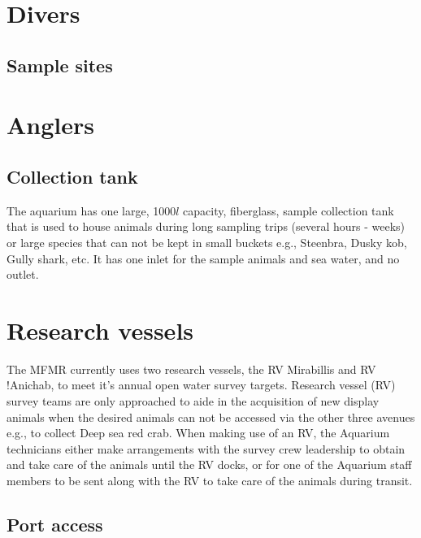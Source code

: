 \documentclass[
  letterpaper,
  DIV=11,
  numbers=noendperiod]{scrreprt}
\begin{document}
\hypertarget{divers}{%
\section{Divers}\label{divers}}

\hypertarget{sample-sites-1}{%
\subsection{Sample sites}\label{sample-sites-1}}

\hypertarget{anglers}{%
\section{Anglers}\label{anglers}}

\hypertarget{collection-tank}{%
\subsection{Collection tank}\label{collection-tank}}

The aquarium has one large, 1000\(l\) capacity, fiberglass, sample
collection tank that is used to house animals during long sampling trips
(several hours - weeks) or large species that can not be kept in small
buckets e.g., Steenbra, Dusky kob, Gully shark, etc. It has one inlet
for the sample animals and sea water, and no outlet.

\hypertarget{research-vessels}{%
\section{Research vessels}\label{research-vessels}}

The MFMR currently uses two research vessels, the RV Mirabillis and RV
!Anichab, to meet it's annual open water survey targets. Research vessel
(RV) survey teams are only approached to aide in the acquisition of new
display animals when the desired animals can not be accessed via the
other three avenues e.g., to collect Deep sea red crab. When making use
of an RV, the Aquarium technicians either make arrangements with the
survey crew leadership to obtain and take care of the animals until the
RV docks, or for one of the Aquarium staff members to be sent along with
the RV to take care of the animals during transit.

\hypertarget{port-access}{%
\subsection{Port access}\label{port-access}}
\end{document}
